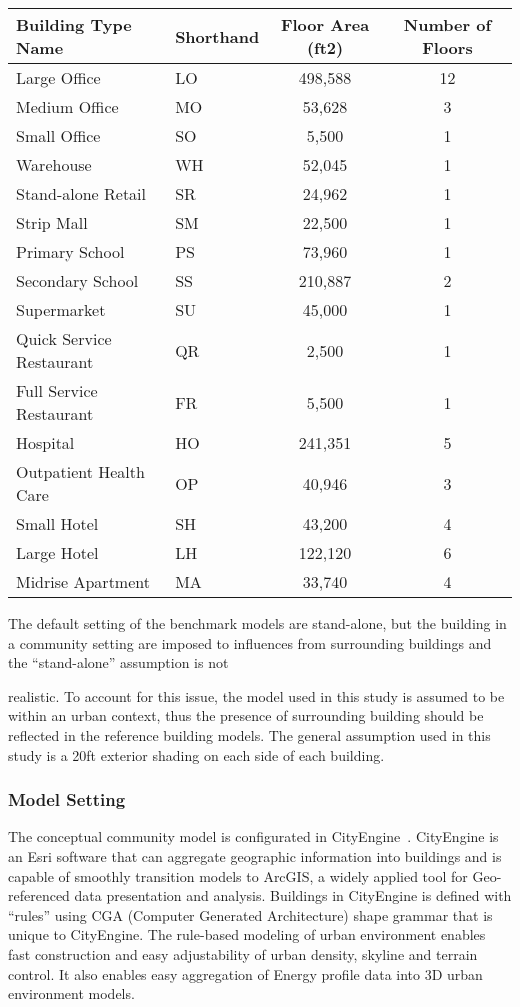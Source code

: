 \documentclass[hidelinks,12pt]{article}
\begin{document}
\begin{table}[h!]
  \centering
  \begin{tabular}{l|l|c|c}
    \hline
Building Type Name&Shorthand&  Floor Area (ft2)    & Number of Floors\\
    \hline
Large Office	         &LO&  498,588	      & 12\\
Medium Office	         &MO&  53,628	      & 3\\
Small Office	         &SO&  5,500	      & 1\\
Warehouse	         &WH&  52,045	      & 1\\
Stand-alone Retail       &SR&  24,962	      & 1\\
Strip Mall	         &SM&  22,500	      & 1\\
Primary School	         &PS&  73,960	      & 1\\
Secondary School         &SS&  210,887	      & 2\\
Supermarket	         &SU&  45,000	      & 1\\
Quick Service Restaurant &QR&  2,500          & 1\\
Full Service Restaurant  &FR&  5,500          & 1\\
Hospital	         &HO&  241,351	      & 5\\
Outpatient Health Care   &OP&  40,946	      & 3\\
Small Hotel	         &SH&  43,200	      & 4\\
Large Hotel	         &LH&  122,120	      & 6\\
Midrise Apartment        &MA&  33,740	      & 4\\
    \hline
\end{tabular}
\end{table}

The default setting of the benchmark models are stand-alone, but the
building in a community setting are imposed to influences from
surrounding buildings and the ``stand-alone'' assumption is not

realistic. To account for this issue, the model used in this study is
assumed to be within an urban context, thus the presence of
surrounding building should be reflected in the reference building
models. The general assumption used in this study is a 20ft exterior
shading on each side of each building.

\subsubsection{Model Setting}
The conceptual community model is configurated in
CityEngine~\cite{cityEngine2015}. CityEngine is an Esri software that
can aggregate geographic information into buildings and is capable of
smoothly transition models to ArcGIS\cite{ArcGIS2015}, a widely
applied tool for Geo-referenced data presentation and
analysis. Buildings in CityEngine is defined with ``rules'' using CGA
(Computer Generated Architecture) shape grammar that is unique to
CityEngine. The rule-based modeling of urban environment enables fast
construction and easy adjustability of urban density, skyline and
terrain control. It also enables easy aggregation of Energy profile
data into 3D urban environment models.
\end{document}
